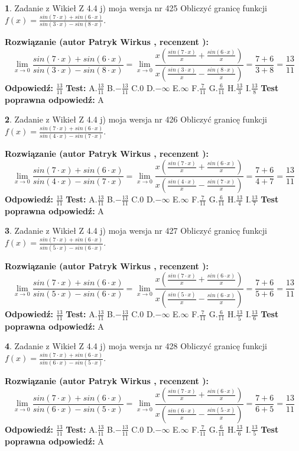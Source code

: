 \documentclass[12pt, a4paper]{article}
\theoremstyle{definition} %
\newtheorem{zad}{}
\newcommand{\zadStart}[1]{\begin{zad}#1\newline}
\newcommand{\zadStop}{\end{zad}}
\newcommand{\rozwStart}[2]{\noindent \textbf{Rozwiązanie (autor #1 , recenzent #2): }\newline}
\newcommand{\rozwStop}{\newline}
\newcommand{\odpStart}{\noindent \textbf{Odpowiedź:}\newline}
\newcommand{\odpStop}{\newline}
\newcommand{\testStart}{\noindent \textbf{Test:}\newline}
\newcommand{\testStop}{\newline}
\newcommand{\kluczStart}{\noindent \textbf{Test poprawna odpowiedź:}\newline}
\newcommand{\kluczStop}{\newline}
\begin{document}
\zadStart{Zadanie z Wikieł Z 4.4 j) moja wersja nr 425}
Obliczyć granicę funkcji $f(x)=\frac{sin(7\cdot x) +sin(6\cdot x)}{sin(3\cdot x) -sin(8\cdot x)}$.
\zadStop
\rozwStart{Patryk Wirkus}{}
$$\lim\limits_{x\to 0}\frac{sin(7\cdot x) +sin(6\cdot x)}{sin(3\cdot x) -sin(8\cdot x)}=\lim\limits_{x\to 0}\frac{x(\frac{sin(7\cdot x)}{x}+\frac{sin(6\cdot x)}{x})}{x(\frac{sin(3\cdot x)}{x}-\frac{sin(8\cdot x)}{x})}=\frac{7+6}{3+8} = \frac{13}{11}$$
\rozwStop
\odpStart
$\frac{13}{11}$
\odpStop
\testStart
A.$\frac{13}{11}$
B.$-\frac{13}{11}$
C.$0$
D.$-\infty$
E.$\infty$
F.$\frac{7}{11}$
G.$\frac{6}{11}$
H.$\frac{13}{3}$
I.$\frac{13}{8}$
\testStop
\kluczStart
A
\kluczStop



\zadStart{Zadanie z Wikieł Z 4.4 j) moja wersja nr 426}
Obliczyć granicę funkcji $f(x)=\frac{sin(7\cdot x) +sin(6\cdot x)}{sin(4\cdot x) -sin(7\cdot x)}$.
\zadStop
\rozwStart{Patryk Wirkus}{}
$$\lim\limits_{x\to 0}\frac{sin(7\cdot x) +sin(6\cdot x)}{sin(4\cdot x) -sin(7\cdot x)}=\lim\limits_{x\to 0}\frac{x(\frac{sin(7\cdot x)}{x}+\frac{sin(6\cdot x)}{x})}{x(\frac{sin(4\cdot x)}{x}-\frac{sin(7\cdot x)}{x})}=\frac{7+6}{4+7} = \frac{13}{11}$$
\rozwStop
\odpStart
$\frac{13}{11}$
\odpStop
\testStart
A.$\frac{13}{11}$
B.$-\frac{13}{11}$
C.$0$
D.$-\infty$
E.$\infty$
F.$\frac{7}{11}$
G.$\frac{6}{11}$
H.$\frac{13}{4}$
I.$\frac{13}{7}$
\testStop
\kluczStart
A
\kluczStop



\zadStart{Zadanie z Wikieł Z 4.4 j) moja wersja nr 427}
Obliczyć granicę funkcji $f(x)=\frac{sin(7\cdot x) +sin(6\cdot x)}{sin(5\cdot x) -sin(6\cdot x)}$.
\zadStop
\rozwStart{Patryk Wirkus}{}
$$\lim\limits_{x\to 0}\frac{sin(7\cdot x) +sin(6\cdot x)}{sin(5\cdot x) -sin(6\cdot x)}=\lim\limits_{x\to 0}\frac{x(\frac{sin(7\cdot x)}{x}+\frac{sin(6\cdot x)}{x})}{x(\frac{sin(5\cdot x)}{x}-\frac{sin(6\cdot x)}{x})}=\frac{7+6}{5+6} = \frac{13}{11}$$
\rozwStop
\odpStart
$\frac{13}{11}$
\odpStop
\testStart
A.$\frac{13}{11}$
B.$-\frac{13}{11}$
C.$0$
D.$-\infty$
E.$\infty$
F.$\frac{7}{11}$
G.$\frac{6}{11}$
H.$\frac{13}{5}$
I.$\frac{13}{6}$
\testStop
\kluczStart
A
\kluczStop



\zadStart{Zadanie z Wikieł Z 4.4 j) moja wersja nr 428}
Obliczyć granicę funkcji $f(x)=\frac{sin(7\cdot x) +sin(6\cdot x)}{sin(6\cdot x) -sin(5\cdot x)}$.
\zadStop
\rozwStart{Patryk Wirkus}{}
$$\lim\limits_{x\to 0}\frac{sin(7\cdot x) +sin(6\cdot x)}{sin(6\cdot x) -sin(5\cdot x)}=\lim\limits_{x\to 0}\frac{x(\frac{sin(7\cdot x)}{x}+\frac{sin(6\cdot x)}{x})}{x(\frac{sin(6\cdot x)}{x}-\frac{sin(5\cdot x)}{x})}=\frac{7+6}{6+5} = \frac{13}{11}$$
\rozwStop
\odpStart
$\frac{13}{11}$
\odpStop
\testStart
A.$\frac{13}{11}$
B.$-\frac{13}{11}$
C.$0$
D.$-\infty$
E.$\infty$
F.$\frac{7}{11}$
G.$\frac{6}{11}$
H.$\frac{13}{6}$
I.$\frac{13}{5}$
\testStop
\kluczStart
A
\kluczStop
\end{document}
